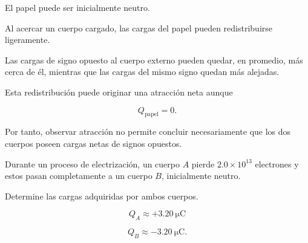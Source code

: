 \begin{explicacion}

El papel puede ser inicialmente neutro.

Al acercar un cuerpo cargado, las cargas del papel pueden redistribuirse
ligeramente.

Las cargas de signo opuesto al cuerpo externo pueden quedar, en promedio,
más cerca de él, mientras que las cargas del mismo signo quedan más alejadas.

Esta redistribución puede originar una atracción neta aunque

\[
Q_{\text{papel}}=0.
\]

Por tanto, observar atracción no permite concluir necesariamente que los dos
cuerpos poseen cargas netas de signos opuestos.

\end{explicacion}



\begin{ejercicio}

Durante un proceso de electrización, un cuerpo \(A\) pierde
\(2.0\times10^{13}\) electrones y estos pasan completamente a un cuerpo
\(B\), inicialmente neutro.

Determine las cargas adquiridas por ambos cuerpos.

\end{ejercicio}

\begin{respuesta}

\[
\boxed{
Q_A\approx+\SI{3.20}{\micro\coulomb}
}
\]

\[
\boxed{
Q_B\approx-\SI{3.20}{\micro\coulomb}
}.
\]

\end{respuesta}

